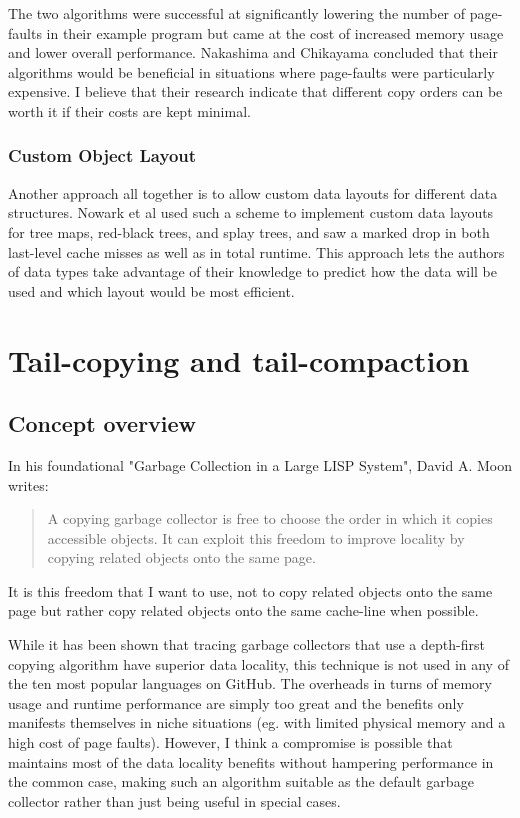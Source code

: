 \documentclass[a4paper,oneside]{memoir}
\begin{document}
The two algorithms were successful at significantly lowering the number of
page-faults in their example program but came at the cost of increased memory
usage and lower overall performance. Nakashima and Chikayama concluded that
their algorithms would be beneficial in situations where page-faults were
particularly expensive. I believe that their research indicate that different
copy orders can be worth it if their costs are kept minimal.

\subsection{Custom Object Layout}

Another approach all together is to allow custom
data layouts for different data structures. Nowark et al used such a scheme to
implement custom data layouts for tree maps, red-black trees, and splay trees,
and saw a marked drop in both last-level cache misses as well as in total
runtime.\cite{Novark:2006} This approach lets the authors of data types take
advantage of their knowledge to predict how the data will be used and which
layout would be most efficient.

\chapter{Tail-copying and tail-compaction}

\section{Concept overview}
\label{concept_overview}

In his foundational "Garbage Collection in a Large LISP System", David A. Moon writes:
\blockquote{A copying garbage collector is free to choose the order in which
it copies accessible objects. It can exploit this freedom to improve locality by
copying related objects onto the same page.}
\cite{Moon:1984}
It is this freedom that I want to use, not to copy related objects onto the same
page but rather copy related objects onto the same cache-line when possible.

While it has been shown that tracing garbage collectors that use a depth-first
copying algorithm have superior data locality, this technique is not used in any
of the ten most popular languages on GitHub. The overheads in turns of memory
usage and runtime performance are simply too great and the benefits only
manifests themselves in niche situations (eg. with limited physical memory and
a high cost of page faults). However, I think a compromise is possible that
maintains most of the data locality benefits without hampering performance in
the common case, making such an algorithm suitable as the default garbage
collector rather than just being useful in special cases.
\end{document}
